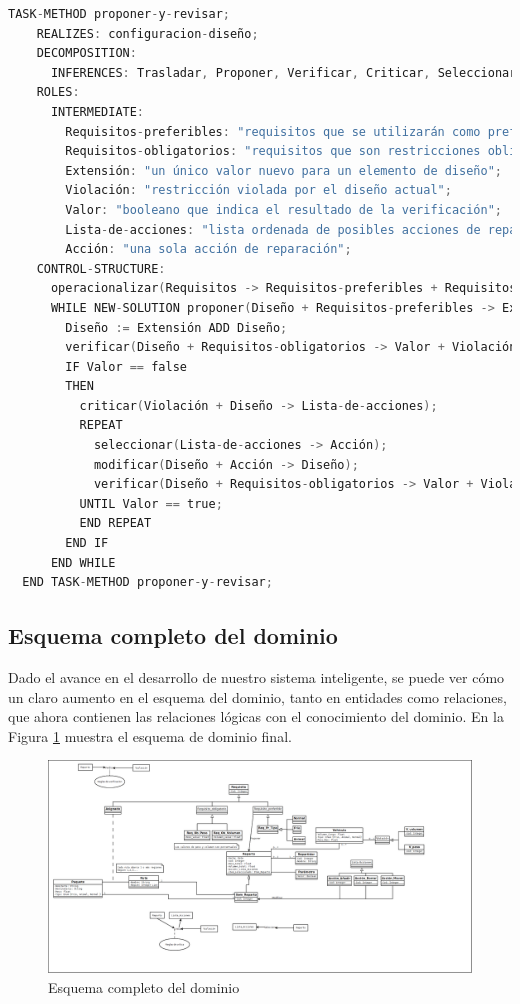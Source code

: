 \begin{lstlisting}[language=C,caption=\textbf{Método de la tarea}]
  TASK-METHOD proponer-y-revisar;
    REALIZES: configuracion-diseño;
    DECOMPOSITION:
      INFERENCES: Trasladar, Proponer, Verificar, Criticar, Seleccionar, Modificar;
    ROLES:
      INTERMEDIATE:
        Requisitos-preferibles: "requisitos que se utilizarán como preferencias (suaves)";
        Requisitos-obligatorios: "requisitos que son restricciones obligatorias (estrictas)";
        Extensión: "un único valor nuevo para un elemento de diseño";
        Violación: "restricción violada por el diseño actual";
        Valor: "booleano que indica el resultado de la verificación";
        Lista-de-acciones: "lista ordenada de posibles acciones de reparación (fijación)";
        Acción: "una sola acción de reparación";
    CONTROL-STRUCTURE:
      operacionalizar(Requisitos -> Requisitos-preferibles + Requisitos-obligatorios);
      WHILE NEW-SOLUTION proponer(Diseño + Requisitos-preferibles -> Extensión) DO
        Diseño := Extensión ADD Diseño;
        verificar(Diseño + Requisitos-obligatorios -> Valor + Violación);
        IF Valor == false
        THEN
          criticar(Violación + Diseño -> Lista-de-acciones);
          REPEAT
            seleccionar(Lista-de-acciones -> Acción);
            modificar(Diseño + Acción -> Diseño);
            verificar(Diseño + Requisitos-obligatorios -> Valor + Violación);
          UNTIL Valor == true;
          END REPEAT
        END IF
      END WHILE
  END TASK-METHOD proponer-y-revisar;
\end{lstlisting}

      
\newpage

\subsection{Esquema completo del dominio}
Dado el avance en el desarrollo de nuestro sistema inteligente, se puede ver cómo un claro aumento en el esquema del dominio, tanto en entidades como relaciones, que ahora contienen las relaciones lógicas con el conocimiento del dominio. En la Figura \ref{fig:DominioCompleto} muestra el esquema de dominio final.

\begin{figure}[H]
  \centering
  \includegraphics[scale=0.20, angle=90]{imaxes/Diagrama_Dominio_Completo.png}
  \caption{\label{fig:DominioCompleto}Esquema completo del dominio}
\end{figure}

